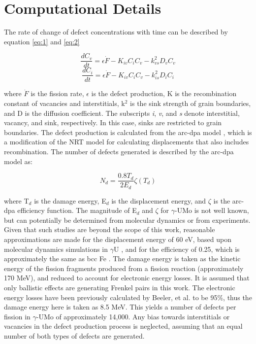 \documentclass[review]{elsarticle}
\begin{document}
\section{Computational Details}

The rate of change of defect concentrations with time can be described by equation \ref{eq:1} and \ref{eq:2}

\begin{equation}
\label{eq:1}
\frac{dC_v}{dt} = \epsilon \dot F - K_{iv}C_iC_v - k^2_{vs}D_vC_v
\end{equation}
\begin{equation}
\label{eq:2}
\frac{dC_i}{dt} = \epsilon \dot F - K_{iv}C_iC_v - k^2_{is}D_iC_i
\end{equation}

where $\dot F$ is the fission rate, $\epsilon$ is the defect production, K is the recombination constant of vacancies and interstitials, k$^2$ is the sink strength of grain boundaries, and D is the diffusion coefficient. The subscripts \textit{i}, \textit{v}, and \textit{s} denote interstitial, vacancy, and sink, respectively. In this case, sinks are restricted to grain boundaries. The defect production is calculated from the arc-dpa model \cite{arcdpa}, which is a modification of the NRT model for calculating displacements that also includes recombination. The number of defects generated is described by the arc-dpa model as:

\begin{equation}
\label{eq:3}
N_d = \frac{0.8T_d}{2E_d}\zeta(T_d)
\end{equation}

where T$_d$ is the damage energy, E$_d$ is the displacement energy, and $\zeta$ is the arc-dpa efficiency function. The magnitude of E$_d$ and $\zeta$ for $\gamma$-UMo is not well known, but can potentially be determined from molecular dynamics or from experiments. Given that such studies are beyond the scope of this work, reasonable approximations are made for the displacement energy of 60 eV, based upon molecular dynamics simulations in $\gamma$U \cite{beeler_Ed}, and for the efficiency of 0.25, which is approximately the same as bcc Fe \cite{arcdpa}. The damage energy is taken as the kinetic energy of the fission fragments produced from a fission reaction (approximately 170 MeV), and reduced to account for electronic energy losses. It is assumed that only ballistic effects are generating Frenkel pairs in this work. The electronic energy losses have been previously calculated by Beeler, et al. \cite{beeler_rad} to be 95\%, thus the damage energy here is taken as 8.5 MeV. This yields a number of defects per fission in $\gamma$-UMo of approximately 14,000. Any bias towards interstitials or vacancies in the defect production process is neglected, assuming that an equal number of both types of defects are generated. 
\end{document}
